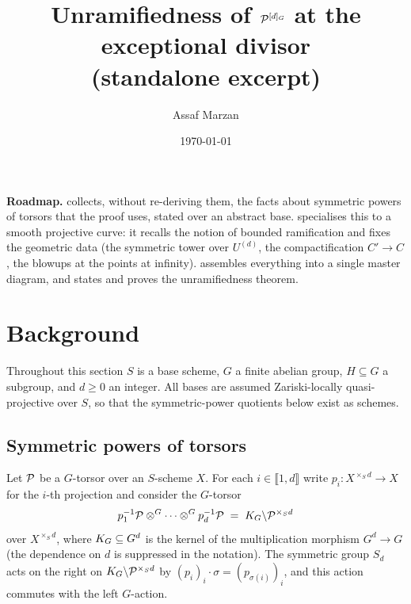 \documentclass[11pt]{article}
\title{Unramifiedness of $\mathcal{P}^{[d]_G}$ at the exceptional divisor\\[2pt]
       {\large (standalone excerpt)}}
\author{Assaf Marzan}
\date{\today}
\begin{document}
\maketitle

\noindent
\textbf{Roadmap.}  collects, without re-deriving them, the
facts about symmetric powers of torsors that the proof uses, stated over an
abstract base.   specialises this to a smooth projective
curve: it recalls the notion of bounded ramification and fixes the geometric
data (the symmetric tower over $U^{(d)}$, the compactification $C' \to C$, the
blowups at the points at infinity).   assembles everything into
a single master diagram, and  states and proves the
unramifiedness theorem.

\section{Background}\label{sec:background}

Throughout this section $S$ is a base scheme, $G$ a finite abelian group,
$H \subseteq G$ a subgroup, and $d \geq 0$ an integer.  All bases are assumed
Zariski-locally quasi-projective over $S$, so that the symmetric-power quotients
below exist as schemes.

\subsection{Symmetric powers of torsors}\label{subsec:sym-powers}

Let $\mathcal{P}$ be a $G$-torsor over an $S$-scheme $X$.  For each
$i \in \llbracket 1,d\rrbracket$ write $p_i : X^{\times_S d} \to X$ for the
$i$-th projection and consider the $G$-torsor
\[
p_1^{-1}\mathcal{P} \otimes^G \cdots \otimes^G p_d^{-1}\mathcal{P} \;=\; K_{G} \backslash \mathcal{P}^{\times_S d}
\]
over $X^{\times_S d}$, where $K_{G} \subseteq G^d$ is the kernel of the
multiplication morphism $G^d \to G$ (the dependence on $d$ is suppressed in the
notation).  The symmetric group $S_d$ acts on the right on
$K_{G} \backslash \mathcal{P}^{\times_S d}$ by $(p_i)_i \cdot \sigma = (p_{\sigma(i)})_i$,
and this action commutes with the left $G$-action.
\end{document}

